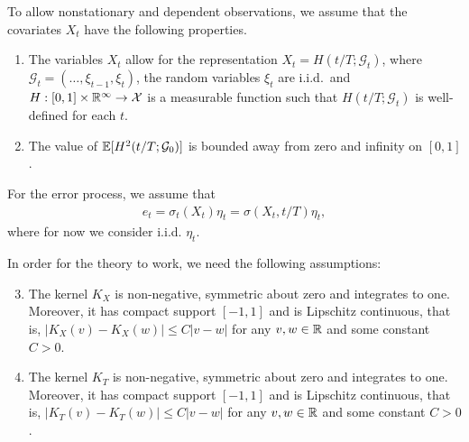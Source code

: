 \documentclass[a4paper,12pt]{article}
\begin{document}
To allow nonstationary and dependent observations, we assume that the covariates $X_t$ have the following properties. 
\begin{enumerate}[label=(C\arabic*),leftmargin=1.05cm]
\item \label{C-reg1} The variables $X_{t}$ allow for the representation $X_{t} = H(t/T; \mathcal{G}_{t})$, where $\mathcal{G}_{t} = (\ldots, \xi_{t-1}, \xi_{t})$, the random variables $\xi_{t}$ are i.i.d.\ and $H: [0, 1] \times \mathbb{R}^\infty \rightarrow \mathcal{X}$ is a measurable function such that $H(t/T; \mathcal{G}_{t})$ is well-defined for each $t$.%
\item \label{C-reg2} The value of $\mathbb{E}[H^2 (t/T; \mathcal{G}_{0})]$ is bounded away from zero and infinity on $[0, 1]$.
\end{enumerate}



For the error process, we assume that
\begin{align*}
e_t = \sigma_t(X_t)\eta_t = \sigma(X_t, t/T) \eta_t,
\end{align*}
where for now we consider i.i.d. $\eta_t$.


In order for the theory to work, we need the following assumptions:

\begin{enumerate}[label=(C\arabic*),leftmargin=1.05cm]
\setcounter{enumi}{2}
\item \label{C-kerX} The kernel $K_X$ is non-negative, symmetric about zero and integrates to one. Moreover, it has compact support $[-1,1]$ and is Lipschitz continuous, that is, $|K_X(v) - K_X(w)| \le C |v-w|$ for any $v,w \in \mathbb{R}$ and some constant $C > 0$. 
\item \label{C-kerT} The kernel $K_T$ is non-negative, symmetric about zero and integrates to one. Moreover, it has compact support $[-1,1]$ and is Lipschitz continuous, that is, $|K_T(v) - K_T(w)| \le C |v-w|$ for any $v,w \in \mathbb{R}$ and some constant $C > 0$. 
\end{enumerate} 
\end{document}
